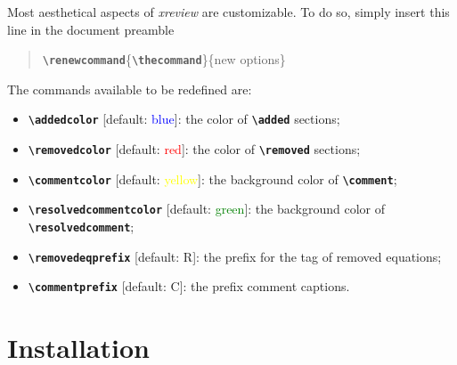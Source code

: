 \documentclass[a4paper]{ltxdoc}
\newcommand{\writecommand}[1]{\texttt{\textbf{{\textbackslash#1}}}}
\newcommand{\writearg}[1]{\{#1\}}
\begin{document}
Most aesthetical aspects of \textit{xreview} are customizable. To do so, simply insert this line in the document preamble
\begin{quote}
    \writecommand{renewcommand}\{\writecommand{thecommand}\}\writearg{new options}
\end{quote}

The commands available to be redefined are:
\begin{itemize}
    \item \writecommand{addedcolor} [default: \textcolor{blue}{blue}]: the color of \writecommand{added} sections;
    \item \writecommand{removedcolor} [default: \textcolor{red}{red}]: the color of \writecommand{removed} sections;
    \item \writecommand{commentcolor} [default: \textcolor{yellow}{yellow}]: the background color of \writecommand{comment};
    \item \writecommand{resolvedcommentcolor} [default: \textcolor{green}{green}]: the background color of \writecommand{resolvedcomment};
    \item \writecommand{removedeqprefix} [default: R]: the prefix for the tag of removed equations;
    \item \writecommand{commentprefix} [default: C]: the prefix comment captions.
\end{itemize}


\section{Installation}
\label{sec:installation}




\end{document}
